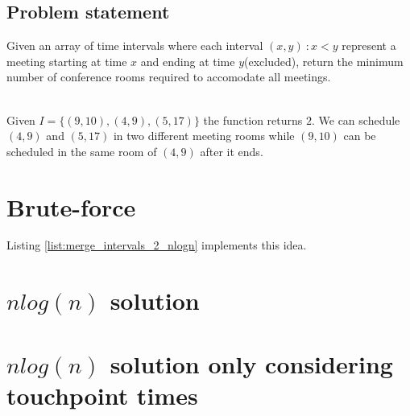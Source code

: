 \subsection{Problem statement}
\begin{exercise}
	\label{example:merge_intervals_2:exercice1_2}
	Given an array of time intervals where each interval $(x,y) \: : x < y$ represent a meeting starting at time $x$ and ending at time $y$(excluded), return the minimum number of conference rooms required to accomodate all meetings.
	
		\begin{example}
			\label{example:merge_intervals_2:example1}
			\hfill \\
			Given $I=\{(9,10),(4,9),(5,17)\}$ the function returns $2$. We can schedule $(4,9)$ and $(5,17)$ in two different meeting rooms while $(9,10)$ can be scheduled in the same room of $(4,9)$ after it ends. 
		\end{example}
	
	\end{exercise}
	

\section{Brute-force}
Listing \ref{list:merge_intervals_2_nlogn} implements this idea.



\section{$nlog(n)$ solution}



\section{$nlog(n)$ solution only considering touchpoint times}
